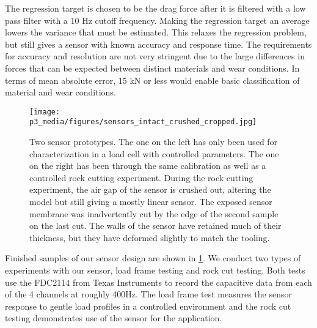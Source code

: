 The regression target is chosen to be the drag force after it is filtered 
with a low pass filter with a 10 Hz cutoff frequency.
Making the regression target an average lowers the variance that must be estimated.
This relaxes the regression problem, but still gives a sensor with known accuracy and response time.
The requirements for accuracy and resolution are not very stringent due to the large differences 
in forces that can be expected between distinct materials and wear conditions.
In terms of mean absolute error, 15 kN or less would enable basic
classification of material and wear conditions.


\begin{figure}[t]
\centering
\texttt{[image: p3\_media/figures/sensors\_intact\_crushed\_cropped.jpg]}
\caption{Two sensor prototypes. The one on the left has only been used for characterization 
in a load cell with controlled parameters. The one on the right has been through the same 
calibration as well as a controlled rock cutting experiment. During the rock cutting experiment,
the air gap of the sensor is crushed out, altering the model but still giving a mostly linear sensor.
The exposed sensor membrane was inadvertently cut by the edge of the second sample on the last cut.
The walls of the sensor have retained much of their thickness, but they have deformed slightly to 
match the tooling.}
\label{fig:sensors_prototypes}
\end{figure}

Finished samples of our sensor design are shown
in \ref{fig:sensors_prototypes}.
We conduct two types of experiments with our sensor, load frame testing and rock cut testing.
Both tests use the FDC2114 from Texas Instruments to record the 
capacitive data from each of the 4 channels at roughly 400Hz. 
The load frame test measures the sensor response to gentle load profiles in a controlled environment
and the rock cut testing demonstrates use of the sensor for the application.

